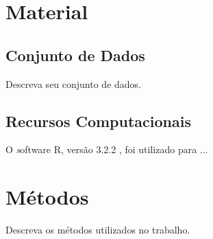\section{Material}

\subsection{Conjunto de Dados} \label{dados}

Descreva seu conjunto de dados.

\subsection{Recursos Computacionais}

O {\textit software} R, versão 3.2.2 \cite{Pedroni2020}, foi utilizado para ...
\cite{Cripps2006}
\section{Métodos}

Descreva os métodos utilizados no trabalho. 